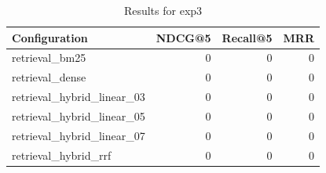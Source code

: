 \begin{table}[htbp]
  \centering
  \caption{Results for exp3}
  \label{tab:exp3}
  \begin{tabular}{lrrr}
    \toprule
    Configuration & NDCG@5 & Recall@5 & MRR \\
    \midrule
    retrieval_bm25 & 0 & 0 & 0 \\
    retrieval_dense & 0 & 0 & 0 \\
    retrieval_hybrid_linear_03 & 0 & 0 & 0 \\
    retrieval_hybrid_linear_05 & 0 & 0 & 0 \\
    retrieval_hybrid_linear_07 & 0 & 0 & 0 \\
    retrieval_hybrid_rrf & 0 & 0 & 0 \\
    \bottomrule
  \end{tabular}
\end{table}